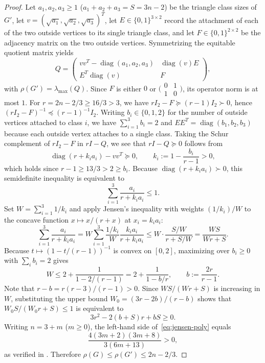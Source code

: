 \documentclass[10pt]{article}
\begin{document}
\begin{proof}
Let $a_1, a_2, a_3 \geq 1$ ($a_1 + a_2 + a_3 = S = 3n - 2$) be the triangle class sizes of $G'$, let $v = (\sqrt{a_1}, \sqrt{a_2}, \sqrt{a_3})^T$, let $E \in \{0,1\}^{3 \times 2}$ record the attachment of each of the two outside vertices to its single triangle class, and let $F \in \{0,1\}^{2 \times 2}$ be the adjacency matrix on the two outside vertices. Symmetrizing the equitable quotient matrix yields
\[
Q = \begin{pmatrix}
vv^T - \operatorname{diag}(a_1, a_2, a_3) & \operatorname{diag}(v) E \\
E^T \operatorname{diag}(v) & F
\end{pmatrix},
\]
with $\rho(G') = \lambda_{\max}(Q)$. Since $F$ is either $0$ or $\bigl(\begin{smallmatrix}0&1\\1&0\end{smallmatrix}\bigr)$, its operator norm is at most $1$. For $r = 2n - 2/3 \geq 16/3 > 3$, we have $rI_2 - F \succeq (r - 1)I_2 \succ 0$, hence $(rI_2 - F)^{-1} \preceq (r - 1)^{-1}I_2$. Writing $b_i \in \{0,1,2\}$ for the number of outside vertices attached to class $i$, we have $\sum_{i=1}^3 b_i = 2$ and $EE^T = \operatorname{diag}(b_1, b_2, b_3)$ because each outside vertex attaches to a single class. Taking the Schur complement of $rI_2 - F$ in $rI - Q$, we see that $rI - Q \succeq 0$ follows from
\[
\operatorname{diag}(r + k_i a_i) - vv^T \succeq 0, \qquad k_i := 1 - \frac{b_i}{r - 1} > 0,
\]
which holds since $r - 1 \geq 13/3 > 2 \geq b_i$. Because $\operatorname{diag}(r + k_i a_i) \succ 0$, this semidefinite inequality is equivalent to
\[
\sum_{i=1}^3 \frac{a_i}{r + k_i a_i} \leq 1.
\]
Set $W = \sum_{i=1}^3 1/k_i$ and apply Jensen's inequality with weights $(1/k_i)/W$ to the concave function $x \mapsto x/(r + x)$ at $x_i = k_i a_i$:
\[
\sum_{i=1}^3 \frac{a_i}{r + k_i a_i}
= W \sum_{i=1}^3 \frac{1/k_i}{W} \frac{k_i a_i}{r + k_i a_i}
\leq W \cdot \frac{S/W}{r + S/W}
= \frac{WS}{Wr + S}.
\]
Because $t \mapsto (1 - t/(r-1))^{-1}$ is convex on $[0, 2]$, maximizing over $b_i \geq 0$ with $\sum_i b_i = 2$ gives
\[
W \leq 2 + \frac{1}{1 - 2/(r-1)} = 2 + \frac{1}{1 - b/r}, \qquad b := \frac{2r}{r - 1}.
\]
Note that $r - b = r(r - 3)/(r - 1) > 0$. Since $WS/(Wr + S)$ is increasing in $W$, substituting the upper bound $W_0 = (3r - 2b)/(r - b)$ shows that $W_0 S/(W_0 r + S) \leq 1$ is equivalent to
\begin{equation}\label{eq:jensen-poly}
3r^2 - 2(b + S)r + bS \geq 0.
\end{equation}
Writing $n = 3 + m$ ($m \geq 0$), the left-hand side of~\eqref{eq:jensen-poly} equals
\[
\frac{4(3m + 2)(3m + 8)}{3(6m + 13)} > 0,
\]
as verified in \texttt{}. Therefore $\rho(G) \leq \rho(G') \leq 2n - 2/3$.


\end{proof}
\end{document}
